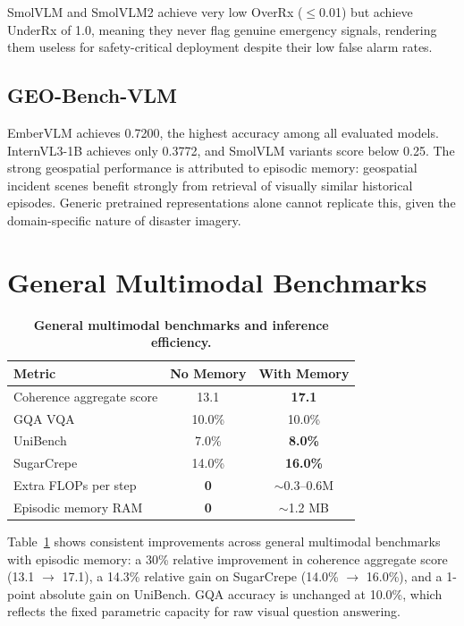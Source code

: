 SmolVLM and SmolVLM2 achieve very low OverRx ($\leq$0.01) but achieve UnderRx of 1.0, meaning they never flag genuine emergency signals, rendering them useless for safety-critical deployment despite their low false alarm rates.

\subsection{GEO-Bench-VLM}

EmberVLM achieves 0.7200, the highest accuracy among all evaluated models. InternVL3-1B achieves only 0.3772, and SmolVLM variants score below 0.25. The strong geospatial performance is attributed to episodic memory: geospatial incident scenes benefit strongly from retrieval of visually similar historical episodes. Generic pretrained representations alone cannot replicate this, given the domain-specific nature of disaster imagery.

\section{General Multimodal Benchmarks}
\label{sec:exp_general}

\begin{table}[htbp]
\centering
\caption{\textbf{General multimodal benchmarks and inference efficiency.}}
\label{tab:general_benchmarks}
\begin{tabular}{lcc}
\toprule
\textbf{Metric} & \textbf{No Memory} & \textbf{With Memory} \\
\midrule
Coherence aggregate score & 13.1 & \textbf{17.1} \\
GQA VQA~\cite{hudson2019gqa} & 10.0\% & 10.0\% \\
UniBench~\cite{altahan2024unibench} & 7.0\% & \textbf{8.0\%} \\
SugarCrepe~\cite{hsieh2023sugarcrepe} & 14.0\% & \textbf{16.0\%} \\
\midrule
Extra FLOPs per step & \textbf{0} & $\sim$0.3--0.6M \\
Episodic memory RAM & \textbf{0} & $\sim$1.2 MB \\
\bottomrule
\end{tabular}
\end{table}

Table~\ref{tab:general_benchmarks} shows consistent improvements across general multimodal benchmarks with episodic memory: a 30\% relative improvement in coherence aggregate score (13.1 $\rightarrow$ 17.1), a 14.3\% relative gain on SugarCrepe (14.0\% $\rightarrow$ 16.0\%), and a 1-point absolute gain on UniBench. GQA accuracy is unchanged at 10.0\%, which reflects the fixed parametric capacity for raw visual question answering.


